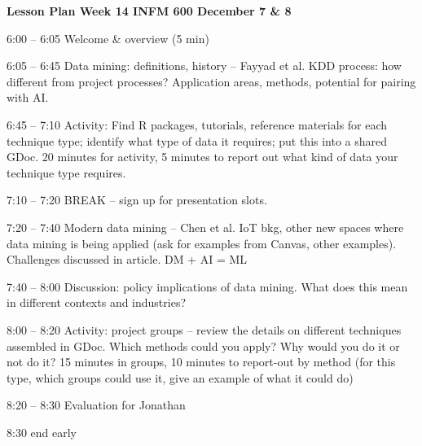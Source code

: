 \documentclass[]{article}
\date{}
\begin{document}
\textbf{Lesson Plan Week 14 INFM 600 December 7 \& 8}

6:00 -- 6:05 Welcome \& overview (5 min)

6:05 -- 6:45 Data mining: definitions, history -- Fayyad et al. KDD
process: how different from project processes? Application areas,
methods, potential for pairing with AI.

6:45 -- 7:10 Activity: Find R packages, tutorials, reference materials
for each technique type; identify what type of data it requires; put
this into a shared GDoc. 20 minutes for activity, 5 minutes to report
out what kind of data your technique type requires.

7:10 -- 7:20 BREAK -- sign up for presentation slots.

7:20 -- 7:40 Modern data mining -- Chen et al. IoT bkg, other new spaces
where data mining is being applied (ask for examples from Canvas, other
examples). Challenges discussed in article. DM + AI = ML

7:40 -- 8:00 Discussion: policy implications of data mining. What does
this mean in different contexts and industries?

8:00 -- 8:20 Activity: project groups -- review the details on different
techniques assembled in GDoc. Which methods could you apply? Why would
you do it or not do it? 15 minutes in groups, 10 minutes to report-out
by method (for this type, which groups could use it, give an example of
what it could do)

8:20 -- 8:30 Evaluation for Jonathan

8:30 end early
\end{document}
